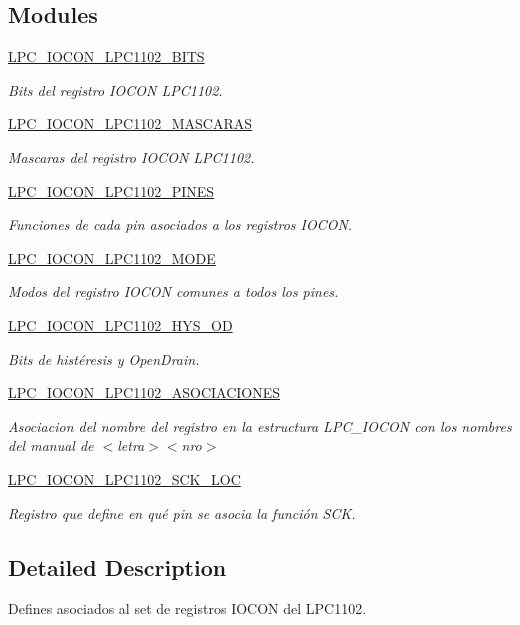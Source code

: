\subsection*{Modules}
\begin{DoxyCompactItemize}
\item 
\hyperlink{group___l_p_c___i_o_c_o_n___l_p_c1102___b_i_t_s}{L\+P\+C\+\_\+\+I\+O\+C\+O\+N\+\_\+\+L\+P\+C1102\+\_\+\+B\+I\+TS}
\begin{DoxyCompactList}\small\item\em Bits del registro I\+O\+C\+ON L\+P\+C1102. \end{DoxyCompactList}\item 
\hyperlink{group___l_p_c___i_o_c_o_n___l_p_c1102___m_a_s_c_a_r_a_s}{L\+P\+C\+\_\+\+I\+O\+C\+O\+N\+\_\+\+L\+P\+C1102\+\_\+\+M\+A\+S\+C\+A\+R\+AS}
\begin{DoxyCompactList}\small\item\em Mascaras del registro I\+O\+C\+ON L\+P\+C1102. \end{DoxyCompactList}\item 
\hyperlink{group___l_p_c___i_o_c_o_n___l_p_c1102___p_i_n_e_s}{L\+P\+C\+\_\+\+I\+O\+C\+O\+N\+\_\+\+L\+P\+C1102\+\_\+\+P\+I\+N\+ES}
\begin{DoxyCompactList}\small\item\em Funciones de cada pin asociados a los registros I\+O\+C\+ON. \end{DoxyCompactList}\item 
\hyperlink{group___l_p_c___i_o_c_o_n___l_p_c1102___m_o_d_e}{L\+P\+C\+\_\+\+I\+O\+C\+O\+N\+\_\+\+L\+P\+C1102\+\_\+\+M\+O\+DE}
\begin{DoxyCompactList}\small\item\em Modos del registro I\+O\+C\+ON comunes a todos los pines. \end{DoxyCompactList}\item 
\hyperlink{group___l_p_c___i_o_c_o_n___l_p_c1102___h_y_s___o_d}{L\+P\+C\+\_\+\+I\+O\+C\+O\+N\+\_\+\+L\+P\+C1102\+\_\+\+H\+Y\+S\+\_\+\+OD}
\begin{DoxyCompactList}\small\item\em Bits de histéresis y Open\+Drain. \end{DoxyCompactList}\item 
\hyperlink{group___l_p_c___i_o_c_o_n___l_p_c1102___a_s_o_c_i_a_c_i_o_n_e_s}{L\+P\+C\+\_\+\+I\+O\+C\+O\+N\+\_\+\+L\+P\+C1102\+\_\+\+A\+S\+O\+C\+I\+A\+C\+I\+O\+N\+ES}
\begin{DoxyCompactList}\small\item\em Asociacion del nombre del registro en la estructura L\+P\+C\+\_\+\+I\+O\+C\+ON con los nombres del manual de $<$letra$>$$<$nro$>$ \end{DoxyCompactList}\item 
\hyperlink{group___l_p_c___i_o_c_o_n___l_p_c1102___s_c_k___l_o_c}{L\+P\+C\+\_\+\+I\+O\+C\+O\+N\+\_\+\+L\+P\+C1102\+\_\+\+S\+C\+K\+\_\+\+L\+OC}
\begin{DoxyCompactList}\small\item\em Registro que define en qué pin se asocia la función S\+CK. \end{DoxyCompactList}\end{DoxyCompactItemize}


\subsection{Detailed Description}
Defines asociados al set de registros I\+O\+C\+ON del L\+P\+C1102. 

